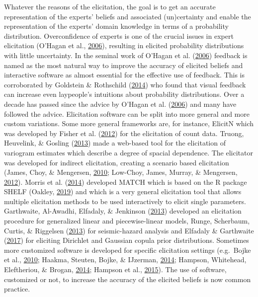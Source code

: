 \documentclass[openright,titlepage,12pt,a4paper]{book}
\begin{document}
Whatever the reasons of the elicitation, the goal is to get an accurate representation of the experts' beliefs and associated (un)certainty and enable the representation of the experts' domain knowledge in terms of a probability distribution. Overconfidence of experts is one of the crucial issues in expert elicitation (O'Hagan et al., \protect\hyperlink{ref-ohagan_uncertain_2006}{2006}), resulting in elicited probability distributions with little uncertainty. In the seminal work of O'Hagan et al. (\protect\hyperlink{ref-ohagan_uncertain_2006}{2006}) feedback is named as the most natural way to improve the accuracy of elicited beliefs and interactive software as almost essential for the effective use of feedback. This is corroborated by Goldstein \& Rothschild (\protect\hyperlink{ref-goldstein_lay_2014}{2014}) who found that visual feedback can increase even laypeople's intuitions about probability distributions. Over a decade has passed since the advice by O'Hagan et al. (\protect\hyperlink{ref-ohagan_uncertain_2006}{2006}) and many have followed the advice. Elicitation software can be split into more general and more custom variations. Some more general frameworks are, for instance, ElicitN which was developed by Fisher et al. (\protect\hyperlink{ref-fisher_software_2012}{2012}) for the elicitation of count data. Truong, Heuvelink, \& Gosling (\protect\hyperlink{ref-truong_web-based_2013}{2013}) made a web-based tool for the elicitation of variogram estimates which describe a degree of spacial dependence. The elicitator was developed for indirect elicitation, creating a scenario based elicitation (James, Choy, \& Mengersen, \protect\hyperlink{ref-james_elicitator:_2010}{2010}; Low-Choy, James, Murray, \& Mengersen, \protect\hyperlink{ref-low-choy_elicitator:_2012}{2012}). Morris et al. (\protect\hyperlink{ref-morris_web-based_2014}{2014}) developed MATCH which is based on the R package SHELF (Oakley, \protect\hyperlink{ref-R-SHELF}{2019}) and which is a very general elicitation tool that allows multiple elicitation methods to be used interactively to elicit single parameters. Garthwaite, Al-Awadhi, Elfadaly, \& Jenkinson (\protect\hyperlink{ref-garthwaite_prior_2013}{2013}) developed an elicitation procedure for generalized linear and piecewise-linear models, Runge, Scherbaum, Curtis, \& Riggelsen (\protect\hyperlink{ref-runge_interactive_2013}{2013}) for seismic-hazard analysis and Elfadaly \& Garthwaite (\protect\hyperlink{ref-elfadaly_eliciting_2017}{2017}) for eliciting Dirichlet and Gaussian copula prior distributions. Sometimes more customized software is developed for specific elicitation settings (e.g.~Bojke et al., \protect\hyperlink{ref-bojke_eliciting_2010}{2010}; Haakma, Steuten, Bojke, \& IJzerman, \protect\hyperlink{ref-haakma_belief_2014}{2014}; Hampson, Whitehead, Eleftheriou, \& Brogan, \protect\hyperlink{ref-hampson_bayesian_2014}{2014}; Hampson et al., \protect\hyperlink{ref-hampson_elicitation_2015}{2015}). The use of software, customized or not, to increase the accuracy of the elicited beliefs is now common practice.
\end{document}
